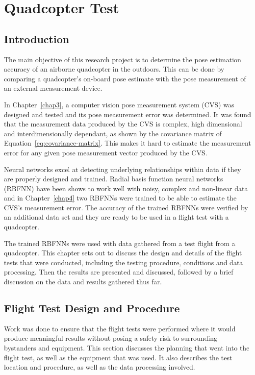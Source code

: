 \chapter{Quadcopter Test}
\label{chap5}

\section{Introduction}

The main objective of this research project is to determine the pose estimation accuracy of an airborne quadcopter in the outdoors. This can be done by comparing a quadcopter's on-board pose estimate with the pose measurement of an external measurement device.  

In Chapter~\ref{chap3}, a computer vision pose measurement system (CVS) was designed and tested and its pose measurement error was determined. It was found that the measurement data produced by the CVS is complex, high dimensional and interdimensionally dependant, as shown by the covariance matrix of Equation~\ref{eq:covariance-matrix}. This makes it hard to estimate the measurement error for any given pose measurement vector produced by the CVS.\@ 

Neural networks excel at detecting underlying relationships within data if they are properly designed and trained. Radial basis function neural networks (RBFNN) have been shows to work well with noisy, complex and non-linear data and in Chapter~\ref{chap4} two RBFNNs were trained to be able to estimate the CVS's measurement error. The accuracy of the trained RBFNNs were verified by an additional data set and they are ready to be used in a flight test with a quadcopter. 

The trained RBFNNs were used with data gathered from a test flight from a quadcopter. This chapter sets out to discuss the design and details of the flight tests that were conducted, including the testing procedure, conditions and data processing. Then the results are presented and discussed, followed by a brief discussion on the data and results gathered thus far. 

\section{Flight Test Design and Procedure}

Work was done to ensure that the flight tests were performed where it would produce meaningful results without posing a safety risk to surrounding bystanders and equipment. This section discusses the planning that went into the flight test, as well as the equipment that was used. It also describes the test location and procedure, as well as the data processing involved.  

